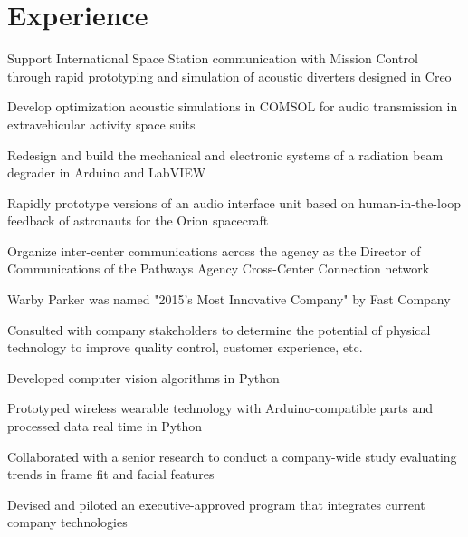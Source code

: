 \documentclass[]{deedy-resume-openfont}
\begin{document}
\begin{minipage}[t]{0.66\textwidth} 


\section{Experience}

\vspace{\topsep} %
\begin{tightemize}
\item Support International Space Station communication with Mission Control through rapid prototyping and simulation of acoustic diverters designed in Creo
\item Develop optimization acoustic simulations in COMSOL for audio transmission in extravehicular activity space suits
\item Redesign and build the mechanical and electronic systems of a radiation beam degrader in Arduino and LabVIEW
\item Rapidly prototype versions of an audio interface unit based on human-in-the-loop feedback of astronauts for the Orion spacecraft
\item Organize inter-center communications across the agency as the Director of Communications of the Pathways Agency Cross-Center Connection network
\end{tightemize}
\sectionsep

\begin{tightemize}
\item Warby Parker was named "2015's Most Innovative Company" by Fast Company
\item Consulted with company stakeholders to determine the potential of physical technology to improve quality control, customer experience, etc.
\item Developed computer vision algorithms in Python 
\item Prototyped wireless wearable technology with Arduino-compatible parts and processed data real time in Python
\item Collaborated with a senior research to conduct a company-wide study evaluating trends in frame fit and facial features
\item Devised and piloted an executive-approved program that integrates current company technologies
\end{tightemize}
\sectionsep


\end{minipage}
\end{document}
